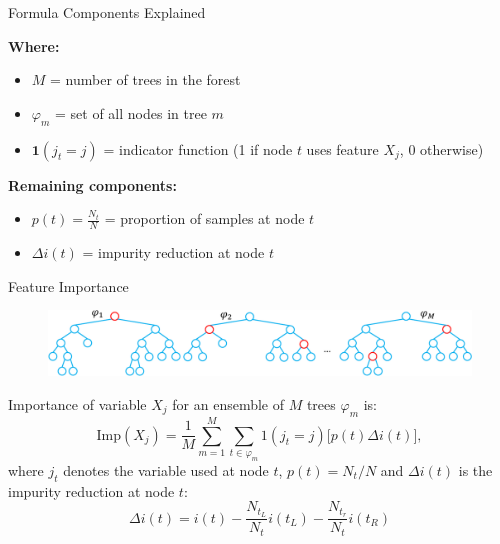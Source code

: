 \documentclass[10pt]{beamer}
\newcommand{\fitpic}[1]{\begin{adjustbox}{max width=\linewidth, max totalheight=0.78\textheight}#1\end{adjustbox}}
\begin{document}
\begin{frame}{Formula Components Explained}
\begin{keypointsbox}
\textbf{Where:}
\begin{itemize}
\item $M$ = number of trees in the forest
\item $\varphi_m$ = set of all nodes in tree $m$
\item $\mathbf{1}(j_t = j)$ = indicator function (1 if node $t$ uses feature $X_j$, 0 otherwise)
\end{itemize}
\end{keypointsbox}

\begin{examplebox}
\textbf{Remaining components:}
\begin{itemize}
\item $p(t) = \frac{N_t}{N}$ = proportion of samples at node $t$
\item $\Delta i(t)$ = impurity reduction at node $t$
\end{itemize}
\end{examplebox}
\end{frame}

\begin{frame}{Feature Importance\footnotemark}
  \begin{figure}
    \fitpic{\includegraphics[scale=0.4]{../assets/ensemble/diagrams/mdi.pdf}}
  \end{figure}
  Importance of variable $X_j$ for an ensemble of $M$ trees $\varphi_{m}$ is:
  \begin{equation*}
    \text{Imp}(X_j) = \frac{1}{M} \sum_{m=1}^M \sum_{t \in \varphi_{m}} 1(j_t = j) \Big[ p(t) \Delta i(t) \Big],
  \end{equation*}
  where $j_t$ denotes the variable used at node $t$, $p(t)=N_t/N$ and $\Delta i(t)$ is the impurity reduction at node $t$:
  \begin{equation*}
    \Delta i(t) = i(t) - \frac{N_{t_L}}{N_t} i(t_L) - \frac{N_{t_r}}{N_t} i(t_R)
  \end{equation*}

\end{frame}
\end{document}
